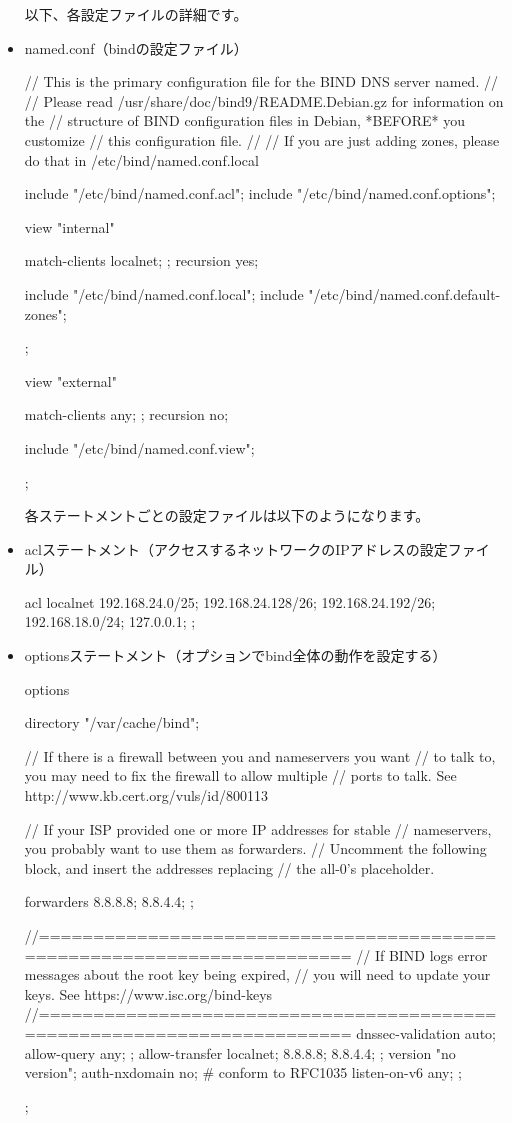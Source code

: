 \documentclass[mingoth,a4paper]{jsarticle}
\begin{document}
\begin{itemize}
以下、各設定ファイルの詳細です。
\clearpage

\item named.conf（bindの設定ファイル）
\begin{commandline}
// This is the primary configuration file for the BIND DNS server named.
//
// Please read /usr/share/doc/bind9/README.Debian.gz for information on the
// structure of BIND configuration files in Debian, *BEFORE* you customize
// this configuration file.
//
// If you are just adding zones, please do that in /etc/bind/named.conf.local

include "/etc/bind/named.conf.acl";
include "/etc/bind/named.conf.options";

view "internal"{
	match-clients { localnet; };
	recursion yes;

include "/etc/bind/named.conf.local";
include "/etc/bind/named.conf.default-zones";

};

view "external" {
	match-clients { any; };
	recursion no;

include "/etc/bind/named.conf.view";

};
\end{commandline}
各ステートメントごとの設定ファイルは以下のようになります。\\

\item aclステートメント（アクセスするネットワークのIPアドレスの設定ファイル）
\begin{commandline}
acl localnet{
	192.168.24.0/25;
	192.168.24.128/26;
	192.168.24.192/26;
	192.168.18.0/24;
	127.0.0.1;
};
\end{commandline}

\item optionsステートメント（オプションでbind全体の動作を設定する）
\begin{commandline}
options {
	directory "/var/cache/bind";

	// If there is a firewall between you and nameservers you want
	// to talk to, you may need to fix the firewall to allow multiple
	// ports to talk.  See http://www.kb.cert.org/vuls/id/800113

	// If your ISP provided one or more IP addresses for stable
	// nameservers, you probably want to use them as forwarders.
	// Uncomment the following block, and insert the addresses replacing
	// the all-0's placeholder.

	forwarders {
	 	8.8.8.8; 8.8.4.4;
	};

	//========================================================================
	// If BIND logs error messages about the root key being expired,
	// you will need to update your keys.  See https://www.isc.org/bind-keys
	//========================================================================
	dnssec-validation auto;
	allow-query { any; };
        allow-transfer{
		localnet;
		8.8.8.8;
		8.8.4.4;
	};
	version "no version";
	auth-nxdomain no;    # conform to RFC1035
	listen-on-v6 { any; };
};
\end{commandline}
\clearpage


\end{itemize}
\end{document}
